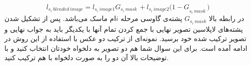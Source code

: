 \documentclass[a4paper]{article}
\begin{document}
\begin{equation*}
	l_{s_i\ blended\ image}=l_{s_i\ image1}G_{s_i\ mask\ }+l_{s_i\ image2}{(1-G}_{s_i\ mask\ })
\end{equation*}
در رابطه بالا
 $G_{s_i\ mask}$ 
پشته‌ی ‌گاوسی مرحله $ i $‌ام ماسک می‌باشد. پس از تشکیل شدن پشته‌‌های لاپلاسین تصویر نهایی با جمع کردن تمام آنها با یکدیگر باید به جواب نهایی و تصویر ترکیب شده خود برسید. نمونه‌ای از ترکیب دو عکس با استفاده از این روش در ادامه آمده است. برای این سوال شما هم دو تصویر به دلخواه خودتان انتخاب کنید و با توضیحات بالا آن دو را به صورت دلخواه با هم ترکیب کنید.
\end{document}

